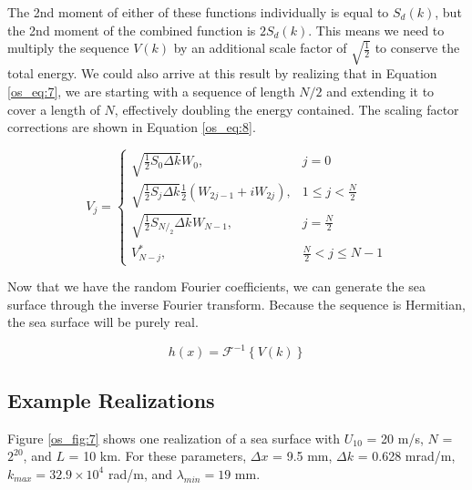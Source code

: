 The 2nd moment of either of these functions individually is equal to $S_d(k)$, but the 2nd moment of the combined function is $2S_d(k)$. This means we need to multiply the sequence $V(k)$ by an additional scale factor of $\sqrt{\frac{1}{2}}$ to conserve the total energy. We could also arrive at this result by realizing that in Equation \ref{os_eq:7}, we are starting with a sequence of length $N/2$ and extending it to cover a length of $N$, effectively doubling the energy contained. The scaling factor corrections are shown in Equation \ref{os_eq:8}.

\begin{equation}
  \label{os_eq:8}   
  V_j = \begin{cases}
    \sqrt{\frac{1}{2}S_0\Delta k}W_0, & j = 0 \\
    \sqrt{\frac{1}{2}S_j\Delta k}\frac{1}{2}\left(W_{2j-1} + iW_{2j} \right), & 1 \leq j < \frac{N}{2} \\
    \sqrt{\frac{1}{2}S_{N/_2}\Delta k}W_{N-1}, & j = \frac{N}{2} \\
    V_{N-j}^*, &  \frac{N}{2} < j \leq N-1 
  \end{cases} 
\end{equation}


Now that we have the random Fourier coefficients, we can generate the sea surface through the inverse Fourier transform. Because the sequence is Hermitian, the sea surface will be purely real.

\begin{equation}
  \label{os_eq:9}
  h(x) = \mathcal{F}^{-1}\left\{V(k) \right\}
  \end{equation}

\subsection{Example Realizations}
Figure \ref{os_fig:7} shows one realization of a sea surface with $U_{10}$ = 20 m/s, $N$ = $2^{20}$, and $L$ = 10 km. For these parameters, $\Delta x$ = 9.5 mm, $\Delta k$ = 0.628 mrad/m, $k_{max} = 32.9\times 10^4$ rad/m, and $\lambda_{min} = 19$ mm.

